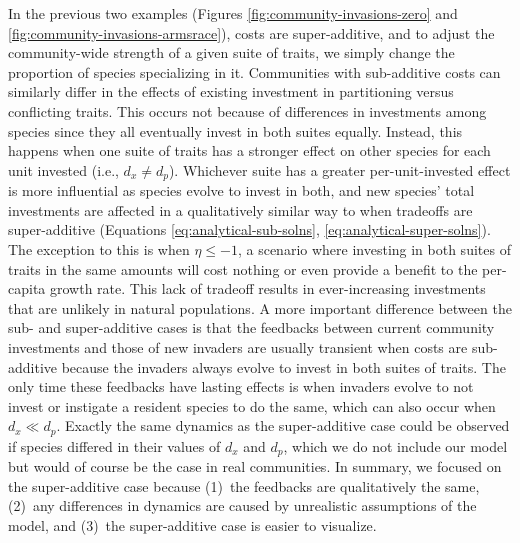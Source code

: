 In the previous two examples (Figures \ref{fig:community-invasions-zero} and
\ref{fig:community-invasions-armsrace}), costs are super-additive, and 
to adjust the community-wide strength of a given suite of traits, 
we simply change the proportion of species specializing in it.
Communities with sub-additive costs can similarly differ in the effects of
existing investment in partitioning versus conflicting traits.
This occurs not because of differences in investments among species since 
they all eventually invest in both suites equally.
Instead, this happens when one suite of traits has a stronger effect on other
species for each unit invested (i.e., $d_x \ne d_p$).
Whichever suite has a greater per-unit-invested effect is more influential 
as species evolve to invest in both, and new species' total investments are
affected in a qualitatively similar way to when tradeoffs are super-additive
(Equations \ref{eq:analytical-sub-solns}, \ref{eq:analytical-super-solns}).
The exception to this is when $\eta \le -1$, a scenario where investing
in both suites of traits in the same amounts will cost nothing or even 
provide a benefit to the per-capita growth rate.
This lack of tradeoff results in ever-increasing investments that are
unlikely in natural populations.
A more important difference between the sub- and super-additive cases
is that the feedbacks between current community investments and those
of new invaders are usually transient when costs are sub-additive because
the invaders always evolve to invest in both suites of traits.
The only time these feedbacks have lasting effects is when invaders
evolve to not invest or instigate a resident species to do the same, 
which can also occur when $d_x \ll d_p$.
Exactly the same dynamics as the super-additive case could be observed
if species differed in their values of $d_x$ and $d_p$, which 
we do not include our model but would of course be the case in real communities.
In summary, we focused on the super-additive case because
(1)~the feedbacks are qualitatively the same,
(2)~any differences in dynamics are caused by unrealistic assumptions
of the model, and
(3)~the super-additive case is easier to visualize.






